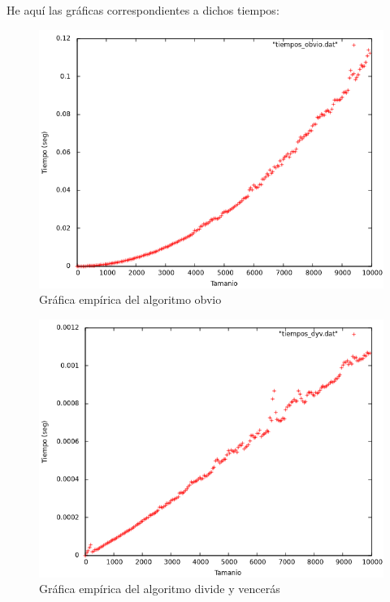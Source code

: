 \documentclass{article}
\begin{document}
	He aquí las gráficas correspondientes a dichos tiempos:

	\begin{figure}[H]
		\centering
		\includegraphics[totalheight=8cm]{img/tiempos_obvio}
		\caption{Gráfica empírica del algoritmo obvio}
		\label{fig:tiempos_obvio}
	\end{figure}

	\begin{figure}[H]
		\centering
		\includegraphics[totalheight=8cm]{img/tiempos_dyv}
		\caption{Gráfica empírica del algoritmo divide y vencerás}
		\label{fig:tiempos_dyv}
	\end{figure}
\end{document}
